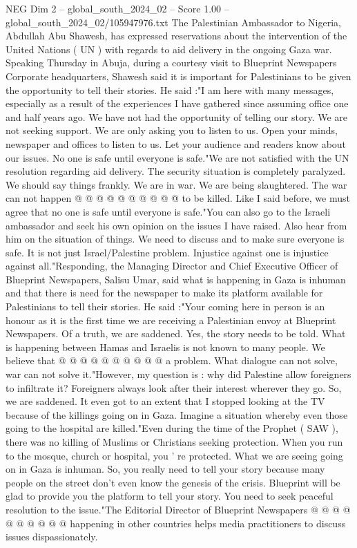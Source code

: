 \begin{textsample}{NEG Dim 2 – global\_south\_2024\_02 – Score 1.00 – global\_south\_2024\_02/105947976.txt}  \label{ex:f2_neg_250}
The Palestinian Ambassador to Nigeria, Abdullah Abu Shawesh, has expressed reservations about the intervention of the United Nations ( UN ) with regards to aid delivery in the ongoing Gaza war.
Speaking Thursday in Abuja, during a courtesy visit to Blueprint Newspapers Corporate headquarters, Shawesh said it is important for Palestinians to be given the opportunity to tell their stories.
He said :"I am here with many messages, especially as a result of the experiences I have gathered since assuming office one and half years ago.
We have not had the opportunity of telling our story.
We are not seeking support.
We are only asking you to listen to us.
Open your minds, newspaper and offices to listen to us.
Let your audience and readers know about our issues.
No one is safe until everyone is safe."We are not satisfied with the UN resolution regarding aid delivery.
The security situation is completely paralyzed.
We should say things frankly.
We are in war.
We are being slaughtered.
The war can not happen @ @ @ @ @ @ @ @ @ @ to be killed.
Like I said before, we must agree that no one is safe until everyone is safe."You can also go to the Israeli ambassador and seek his own opinion on the issues I have raised.
Also hear from him on the situation of things.
We need to discuss and to make sure everyone is safe.
It is not just Israel/Palestine problem.
Injustice against one is injustice against all."Responding, the Managing Director and Chief Executive Officer of Blueprint Newspapers, Salisu Umar, said what is happening in Gaza is inhuman and that there is need for the newspaper to make its platform available for Palestinians to tell their stories.
He said :"Your coming here in person is an honour as it is the first time we are receiving a Palestinian envoy at Blueprint Newspapers.
Of a truth, we are saddened.
Yes, the story needs to be told.
What is happening between Hamas and Israelis is not known to many people.
We believe that @ @ @ @ @ @ @ @ @ @ a problem.
What dialogue can not solve, war can not solve it."However, my question is : why did Palestine allow foreigners to infiltrate it?
Foreigners always look after their interest wherever they go.
So, we are saddened.
It even got to an extent that I stopped looking at the TV because of the killings going on in Gaza.
Imagine a situation whereby even those going to the hospital are killed."Even during the time of the Prophet ( SAW ), there was no killing of Muslims or Christians seeking protection.
When you run to the mosque, church or hospital, you ' re protected.
What we are seeing going on in Gaza is inhuman.
So, you really need to tell your story because many people on the street don't even know the genesis of the crisis.
Blueprint will be glad to provide you the platform to tell your story.
You need to seek peaceful resolution to the issue."The Editorial Director of Blueprint Newspapers @ @ @ @ @ @ @ @ @ @ happening in other countries helps media practitioners to discuss issues dispassionately.

\end{textsample}
